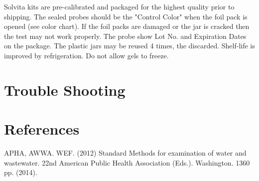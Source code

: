 \documentclass[12pt]{../SOP3_beta}\usepackage[]{graphicx}\usepackage[]{xcolor}
\begin{document}
\NP Solvita kits are pre-calibrated and packaged for the highest quality prior to shipping. The sealed probes should be the "Control Color" when the foil pack is opened (see color chart). If the foil packs are damaged or the jar is cracked then the test may not work properly. The probe show Lot No. and Expiration Dates on the package. The plastic jars may be reused 4 times, the discarded. Shelf-life is improved by refrigeration. Do not allow gels to freeze. 

\section{Trouble Shooting}

\section{References}

\NP APHA, AWWA. WEF. (2012) Standard Methods for examination of water and wastewater. 22nd American Public Health Association (Eds.). Washington. 1360 pp. (2014).
\end{document}
